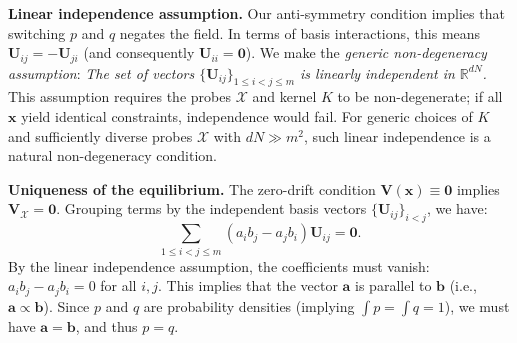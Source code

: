 \documentclass{article}
\renewcommand{\paragraph}[1]{\vspace{.05em}\noindent\textbf{#1}}
\theoremstyle{plain}
\theoremstyle{definition}
\theoremstyle{remark}
\begin{document}
\paragraph{Linear independence assumption.}
Our anti-symmetry condition implies that switching $p$ and $q$ negates the field. In terms of basis interactions, this means $\mathbf{U}_{ij} = -\mathbf{U}_{ji}$ (and consequently $\mathbf{U}_{ii} = \mathbf{0}$).
We make the \emph{generic non-degeneracy assumption}:
\textit{The set of vectors $\{\mathbf{U}_{ij}\}_{1 \le i < j \le m}$ is linearly independent in $\mathbb{R}^{dN}$.}
This assumption requires the probes $\mathcal{X}$ and kernel $K$ to be non-degenerate; if all $\mathbf{x}$ yield identical constraints, independence would fail. For generic choices of $K$ and sufficiently diverse probes $\mathcal{X}$ with $dN\gg m^2$, such linear independence is a natural non-degeneracy condition.


\paragraph{Uniqueness of the equilibrium.}
The zero-drift condition $\mathbf{V}(\mathbf{x}) \equiv \mathbf{0}$ implies $\mathbf{V}_{\mathcal{X}} = \mathbf{0}$. Grouping terms by the independent basis vectors $\{\mathbf{U}_{ij}\}_{i<j}$, we have:
\begin{equation}
\sum_{1 \le i < j \le m} (a_i b_j - a_j b_i) \mathbf{U}_{ij} = \mathbf{0}.
\end{equation}
By the linear independence assumption, the coefficients must vanish: $a_i b_j - a_j b_i = 0$ for all $i,j$.
This implies that the vector $\mathbf{a}$ is parallel to $\mathbf{b}$ (i.e., $\mathbf{a} \propto \mathbf{b}$).
Since $p$ and $q$ are probability densities (implying $\int p = \int q = 1$), we must have $\mathbf{a} = \mathbf{b}$, and thus $p=q$.
\end{document}
